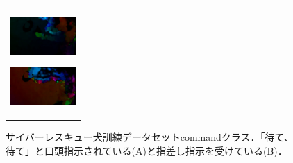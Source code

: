 \begin{enumerate}
\begin{end}
\begin{figure}[H]
\begin{tabular}{l}
\begin{minipage}{0.165\hsize}
        \begin{center}
          \includegraphics[clip, width=2.5cm]{./Figures/optic_commandshoo4.eps}
          \hspace{0.1cm} { }
        \end{center}
      \end{minipage}
      \begin{minipage}{0.165\hsize}
        \begin{center}
          \includegraphics[clip, width=2.5cm]{./Figures/optic_commandshoo5.eps}
          \hspace{2.2cm} { }
        \end{center}
      \end{minipage}
    \end{tabular}
    \caption{サイバーレスキュー犬訓練データセットcommandクラス．「待て、待て」と口頭指示されている(A)と指差し指示を受けている(B)．}
    \label{command}
\end{figure}

\begin{figure}[H]
    \begin{tabular}{l}

\\ %


\end{tabular}
\end{figure}
\end{end}
\end{enumerate}
